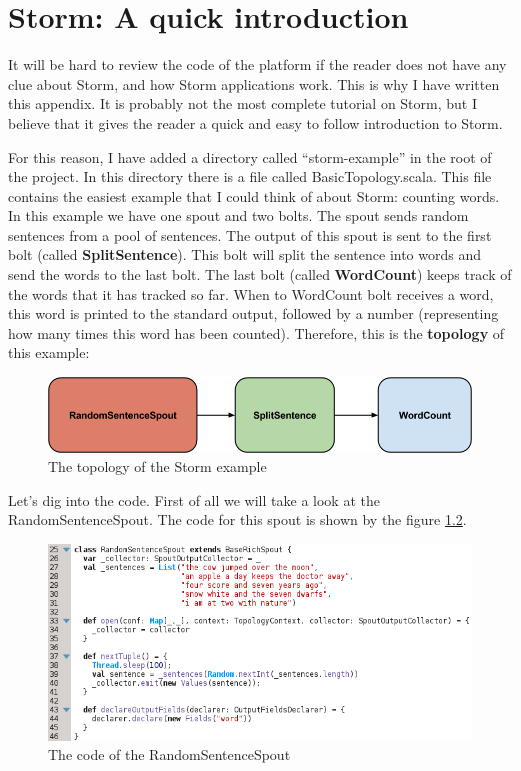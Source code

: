 
\chapter{Storm: A quick introduction}

It will be hard to review the code of the platform if the reader does not have
any clue about Storm, and how Storm applications work. This is why I have
written this appendix. It is probably not the most complete tutorial on Storm,
but I believe that it gives the reader a quick and easy to follow introduction
to Storm.

For this reason, I have added a directory called ``storm-example'' in the root
of the project. In this directory there is a file called BasicTopology.scala.
This file contains the easiest example that I could think of about Storm:
counting words. In this example we have one spout and two bolts. The spout
sends random sentences from a pool of sentences. The output of this spout is
sent to the first bolt (called {\bf SplitSentence}). This bolt will split the
sentence into words and send the words to the last bolt. The last bolt (called
{\bf WordCount}) keeps track of the words that it has tracked so far. When to
WordCount bolt receives a word, this word is printed to the standard output,
followed by a number (representing how many times this word has been counted).
Therefore, this is the {\bf topology} of this example:

\begin{figure}[H]
  \centering
  \includegraphics[scale=0.5]{images/example.png}
  \caption{The topology of the Storm example}\label{fig:example}
\end{figure}

Let's dig into the code. First of all we will take a look at the
RandomSentenceSpout. The code for this spout is shown by the figure
\ref{fig:randomsentencespout}.

\begin{figure}
  \centering
  \includegraphics[scale=0.8]{images/randomsentencespout.png}
  \caption{The code of the RandomSentenceSpout}\label{fig:randomsentencespout}
\end{figure}

